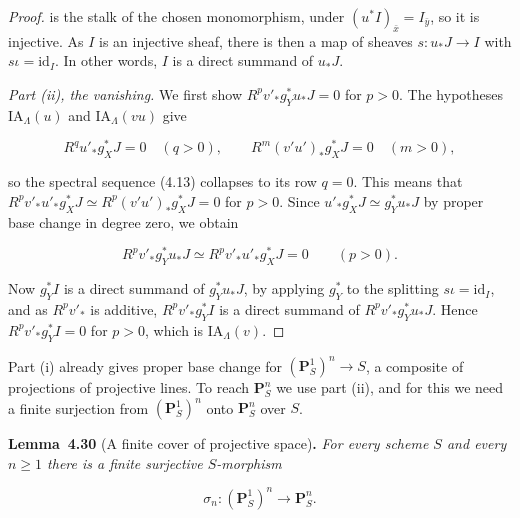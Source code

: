 \documentclass[11pt]{article}
\newenvironment{bpstatement}[2]{\par\addvspace{0.6\baselineskip}\noindent\textbf{#1}#2\textbf{.}\enspace\ignorespaces}
  {\par\addvspace{0.4\baselineskip}}
\newenvironment{bpstatementit}[2]{\begin{bpstatement}{#1}{#2}\itshape\ignorespaces}{\end{bpstatement}}
\begin{document}
\begin{proof}[{Proof}]
is the stalk of the chosen monomorphism, under \((u^*I)_{\bar x}=I_{\bar y}\), so it is injective. As \(I\) is an injective sheaf, there is then a map of sheaves \(s:u_*J\to I\) with \(s\iota=\mathrm{id}_I\). In other words, \(I\) is a direct summand of \(u_*J\).

\emph{Part (ii), the vanishing.} We first show \(R^pv'_*g_Y^*u_*J=0\) for \(p>0\). The hypotheses \(\mathrm{IA}_\Lambda(u)\) and \(\mathrm{IA}_\Lambda(vu)\) give

\[
R^qu'_*g_X^*J=0\quad(q>0),\qquad
R^m(v'u')_*g_X^*J=0\quad(m>0),
\]

so the spectral sequence (4.13) collapses to its row \(q=0\). This means that \(R^pv'_*u'_*g_X^*J\simeq R^p(v'u')_*g_X^*J=0\) for \(p>0\). Since \(u'_*g_X^*J\simeq g_Y^*u_*J\) by proper base change in degree zero, we obtain

\[
R^pv'_*g_Y^*u_*J
\simeq R^pv'_*u'_*g_X^*J=0\qquad(p>0).
\]

Now \(g_Y^*I\) is a direct summand of \(g_Y^*u_*J\), by applying \(g_Y^*\) to the splitting \(s\iota=\mathrm{id}_I\), and as \(R^pv'_*\) is additive, \(R^pv'_*g_Y^*I\) is a direct summand of \(R^pv'_*g_Y^*u_*J\). Hence \(R^pv'_*g_Y^*I=0\) for \(p>0\), which is \(\mathrm{IA}_\Lambda(v)\).
\end{proof}

\label{bp87}%
Part (i) already gives proper base change for \((\mathbf P^1_S)^n\to S\), a composite of projections of projective lines. To reach \(\mathbf P^n_S\) we use part (ii), and for this we need a finite surjection from \((\mathbf P^1_S)^n\) onto \(\mathbf P^n_S\) over \(S\).

\label{bp88}%
\begin{bpstatementit}{Lemma~4.30}{ (A finite cover of projective space)}
For every scheme \(S\) and every \(n\geq1\) there is a finite surjective \(S\)-morphism

\[
\sigma_n:(\mathbf P^1_S)^n\longrightarrow\mathbf P^n_S.
\]
\end{bpstatementit}
\end{document}
